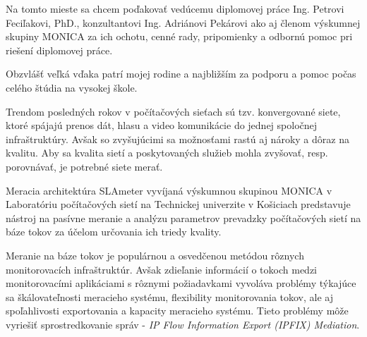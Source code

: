 \documentclass[]{tukediphc}
\begin{document}
\renewcommand\theHfigure{\theHsection.\arabic{figure}}
\renewcommand\theHtable{\theHsection.\arabic{table}}





\prvastrana

\titulnastrana

\abstraktsk %

\abstrakteng %

\kabstrakt %

 

\cestnevyhlasenie

\podakovanie
Na tomto mieste sa chcem poďakovať vedúcemu diplomovej práce Ing. Petrovi 
Feciľakovi, PhD., konzultantovi Ing. Adriánovi Pekárovi ako aj členom 
výskumnej skupiny MONICA za ich ochotu, cenné
rady, pripomienky a odbornú pomoc pri riešení diplomovej práce.

Obzvlášť veľká vďaka patrí mojej rodine a najbližším za podporu a pomoc 
počas celého štúdia na vysokej škole.
\kpodakovania

\predhovor

Trendom posledných rokov v počítačových sieťach sú tzv. konvergované siete, ktoré spájajú prenos dát, 
hlasu a video komunikácie do jednej spoločnej infraštruktúry. Avšak so zvyšujúcimi sa možnosťami rastú 
aj nároky a dôraz na kvalitu. Aby sa kvalita sietí a poskytovaných služieb mohla zvyšovať, resp. 
porovnávať, je potrebné siete merať.

Meracia architektúra SLAmeter vyvíjaná výskumnou skupinou MONICA v Laboratóriu počítačových sietí na 
Technickej univerzite v Košiciach predstavuje nástroj na pasívne meranie a analýzu parametrov prevadzky
počítačových sietí na báze tokov za účelom určovania ich triedy kvality.

Meranie na báze tokov je populárnou a osvedčenou metódou rôznych monitorovacích infraštruktúr. Avšak 
zdieľanie informácií o tokoch medzi monitorovacími aplikáciami s rôznymi požiadavkami vyvoláva problémy 
týkajúce sa škálovateľnosti meracieho systému, flexibility monitorovania tokov, ale aj spoľahlivosti 
exportovania a kapacity meracieho systému. Tieto problémy môže vyriešiť sprostredkovanie správ -
\emph{IP Flow Information Export (IPFIX) Mediation}.
\end{document}
